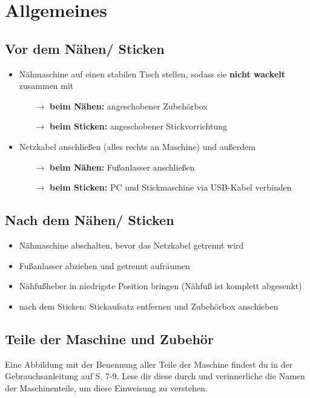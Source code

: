 \documentclass{\basedir/fablab-document}
\newcommand{\pfeil}{\ensuremath{\rightarrow}}
\begin{document}
\pagebreak
\section{Allgemeines}

\subsection{Vor dem Nähen/ Sticken}
\begin{itemize}
 \item Nähmaschine auf einen stabilen Tisch stellen, sodass sie \textbf{nicht wackelt} zusammen mit
 \begin{itemize}
 	\item[\pfeil] \textbf{beim Nähen:} angeschobener Zubehörbox
 	\item[\pfeil] \textbf{beim Sticken:} angeschobener Stickvorrichtung
 \end{itemize}
 \item Netzkabel anschließen (alles rechts an Maschine) und außerdem
  \begin{itemize}
 	\item[\pfeil] \textbf{beim Nähen:} Fußanlasser anschließen
 	\item[\pfeil] \textbf{beim Sticken:} PC und Stickmaschine via USB-Kabel verbinden
 \end{itemize}
\end{itemize}

\subsection{Nach dem Nähen/ Sticken}
\begin{itemize}
 \item Nähmaschine abschalten, bevor das Netzkabel getrennt wird
 \item Fußanlasser abziehen und getrennt aufräumen
 \item Nähfußheber in niedrigste Position bringen (Nähfuß ist komplett abgesenkt)
 \item nach dem Sticken: Stickaufsatz entfernen und Zubehörbox anschieben
\end{itemize}

\subsection{Teile der Maschine und Zubehör}

Eine Abbildung mit der Benennung aller Teile der Maschine findest du in der Gebrauchsanleitung auf S. 7-9. Lese dir diese durch und verinnerliche die Namen der Maschinenteile, um diese Einweisung zu verstehen.
\end{document}
